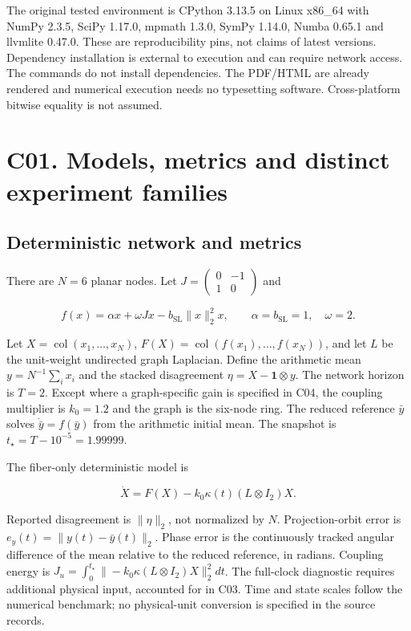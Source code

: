 \documentclass[11pt,a4paper]{article}
\begin{document}
The original tested environment is CPython 3.13.5 on Linux x86\_64 with
NumPy 2.3.5, SciPy 1.17.0, mpmath 1.3.0, SymPy 1.14.0, Numba 0.65.1 and
llvmlite 0.47.0. These are reproducibility pins, not claims of latest
versions. Dependency installation is external to execution and can
require network access. The commands do not install dependencies. The
PDF/HTML are already rendered and numerical execution needs no
typesetting software. Cross-platform bitwise equality is not assumed.

\section{C01. Models, metrics and distinct experiment
families}\label{c01}

\subsection{Deterministic network and metrics}\label{c01-deterministic}

There are \(N=6\) planar nodes. Let
\(J=\left(\begin{smallmatrix}0&-1\\1&0\end{smallmatrix}\right)\) and

\[
f(x)=\alpha x+\omega Jx-b_{\mathrm{SL}}\|x\|_2^2x,
\qquad \alpha=b_{\mathrm{SL}}=1,\quad \omega=2.
\]

Let \(X=\operatorname{col}(x_1,\ldots,x_N)\),
\(F(X)=\operatorname{col}(f(x_1),\ldots,f(x_N))\), and let \(L\) be the
unit-weight undirected graph Laplacian. Define the arithmetic mean
\(y=N^{-1}\sum_i x_i\) and the stacked disagreement
\(\eta=X-\mathbf1\otimes y\). The network horizon is \(T=2\). Except
where a graph-specific gain is specified in C04, the coupling multiplier
is \(k_0=1.2\) and the graph is the six-node ring. The reduced reference
\(\bar y\) solves \(\dot{\bar y}=f(\bar y)\) from the arithmetic initial
mean. The snapshot is \(t_\star=T-10^{-5}=1.99999\).

The fiber-only deterministic model is

\[
\dot X=F(X)-k_0\kappa(t)(L\otimes I_2)X. \tag{E01}
\]

Reported disagreement is \(\|\eta\|_2\), not normalized by \(N\).
Projection-orbit error is \(e_y(t)=\|y(t)-\bar y(t)\|_2\). Phase error
is the continuously tracked angular difference of the mean relative to
the reduced reference, in radians. Coupling energy is
\(J_u=\int_0^{t_\star}\|-k_0\kappa(L\otimes I_2)X\|_2^2dt\). The
full-clock diagnostic requires additional physical input, accounted for
in C03. Time and state scales follow the numerical benchmark; no
physical-unit conversion is specified in the source records.
\end{document}
